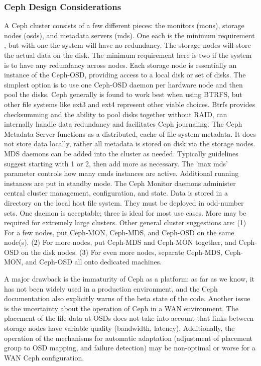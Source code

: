 \documentclass[11pt]{article}
\begin{document}
\subsubsection{Ceph Design Considerations}
A Ceph cluster consists of a few different pieces: the monitors (mons), 
storage nodes (osds), and metadata servers (mds). One each is the minimum 
requirement , but with one the system will have no  redundancy.
The storage nodes will store the actual data on the disk. The minimum 
requirement here is two if the system is to have any redundancy across 
nodes. Each storage node is essentially an instance of the Ceph-OSD, 
providing access to a local disk or set of disks. The simplest option is 
to use one Ceph-OSD daemon per hardware node and then pool the disks. 
Ceph generally is found to work best when using BTRFS, but other file 
systems like ext3 and ext4 represent other viable choices. Btrfs provides 
checksumming and the ability to pool disks together without RAID, can 
internally handle data redundancy and facilitates Ceph journaling. 
The Ceph Metadata Server functions as a distributed, cache of file system 
metadata. It does not store data locally, rather all metadata is stored on 
disk via the storage nodes. MDS daemons can be added into the cluster as 
needed. Typically guidelines suggest starting with 1 or 2, then add more 
as necessary.  The 'max mds' parameter controls how many cmds instances 
are active. Additional running instances are put in standby mode. The 
Ceph Monitor daemons administer central cluster management, configuration, 
and state. Data is stored in a directory on the local host file system. 
They must be deployed in odd-number sets. One daemon is acceptable; three 
is ideal for most use cases. More may be required for extremely large 
clusters. Other general cluster suggestions are: (1) For a few nodes,  
put Ceph-MON, Ceph-MDS, and Ceph-OSD on the same node(s). (2) For more 
nodes,  put Ceph-MDS and Ceph-MON together, and Ceph-OSD on the disk nodes. 
(3) For even more nodes, separate Ceph-MDS, Ceph-MON, and Ceph-OSD all 
onto dedicated machines.

A major drawback is the immaturity of Ceph as a platform: as far as we know, 
it has not been widely used in a production environment, and the Ceph 
documentation also explicitly warns of the beta state of the code. Another 
issue is the uncertainty about the operation of Ceph in a WAN environment. 
The placement of the file data at OSDs does not take into account that 
links between storage nodes have variable quality (bandwidth, latency). 
Additionally, the operation of the mechanisms for automatic adaptation 
(adjustment of placement group to OSD mapping, and failure detection) 
may be non-optimal or worse for a WAN Ceph configuration.
\end{document}
